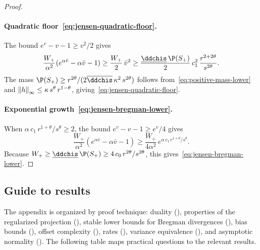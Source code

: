 \documentclass{article}
\begin{document}
\begin{proof}
\paragraph{Quadratic floor~\eqref{eq:jensen-quadratic-floor}.}
The bound $e^v - v - 1 \ge v^2/2$ gives
\[
\frac{W_+}{\alpha^2}(e^{\alpha \bar v} - \alpha \bar v - 1)
  \ge \frac{W_+}{2}\, \bar v^2
  \ge \frac{\underline{\ddchis}\, \P(S_+)}{2}\,
    c_1^2\, \frac{r^{2+2\theta}}{s^{2\theta}}.
\]
The mass $\P(S_+) \ge r^{2\theta} / (2\overline{\ddchis}\, \kappa^2\, s^{2\theta})$
follows from~\eqref{eq:positive-mass-lower}
and $\norm{h}_\infty \le \kappa\, s^\theta\, r^{1-\theta}$,
giving~\eqref{eq:jensen-quadratic-floor}.

\paragraph{Exponential growth~\eqref{eq:jensen-bregman-lower}.}
When $\alpha\, c_1\, r^{1+\theta}/s^\theta \ge 2$,
the bound $e^v - v - 1 \ge e^v/4$ gives
\[
\frac{W_+}{\alpha^2}(e^{\alpha \bar v} - \alpha \bar v - 1)
  \ge \frac{W_+}{4\alpha^2}\,
    e^{\alpha\, c_1\, r^{1+\theta}/s^\theta}.
\]
Because $W_+ \ge \underline{\ddchis}\, \P(S_+)
  \ge 4\, c_0\, r^{2\theta}/s^{2\theta}$,
this gives~\eqref{eq:jensen-bregman-lower}.
\end{proof}


\subsection*{Guide to results}

The appendix is organized by proof technique:
duality (),
properties of the regularized projection (),
stable lower bounds for Bregman divergences (),
bias bounds (),
offset complexity (),
rates (),
variance equivalence (),
and asymptotic normality ().
The following table maps practical questions
to the relevant results.

\medskip
\end{document}
